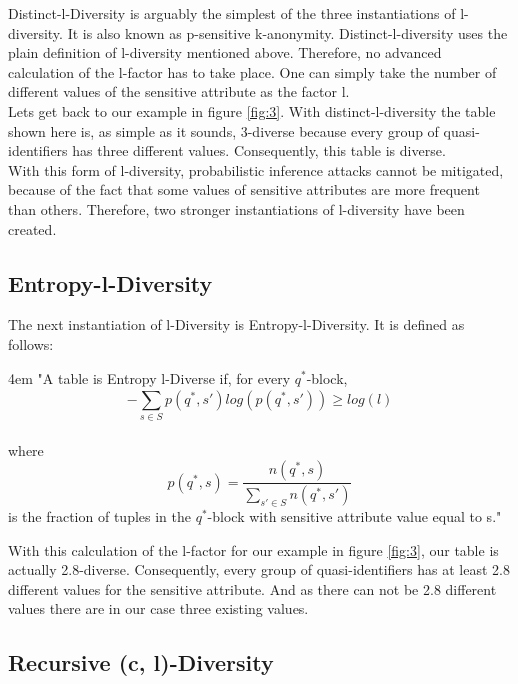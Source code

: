 \documentclass[12pt, a4paper,oneside]{report}
\begin{document}
Distinct-l-Diversity is arguably the simplest of the three instantiations of l-diversity. It is also known as p-sensitive k-anonymity. Distinct-l-diversity uses the plain definition of l-diversity mentioned above. Therefore, no advanced calculation of the l-factor has to take place. One can simply take the number of different values of the sensitive attribute as the factor l\cite{Fung2010}.\\
Lets get back to our example in figure \ref{fig:3}. With distinct-l-diversity the table shown here is, as simple as it sounds, 3-diverse because every group of quasi-identifiers has three different values. Consequently, this table is diverse.\\ 
With this form of l-diversity, probabilistic inference attacks cannot be mitigated, because of the fact that some values of sensitive attributes are more frequent than others. Therefore, two stronger instantiations of l-diversity have been created\cite{Fung2010}. 

\subsection{Entropy-l-Diversity}

The next instantiation of l-Diversity is Entropy-l-Diversity. It is defined as follows:
\par
\begingroup
\leftskip4em
\rightskip\leftskip
"A table is Entropy l-Diverse if, for every $q^*$-block,\\
\[ - \sum_{s \in S}^{}p(q^*, s')log(p(q^*, s')) \geq log(l)\]\\
where \[ p(q^*, s) = \frac{n(q^*, s)}{\sum_{s' \in S}^{}n(q^*, s')} \] is the fraction of tuples in the $q^*$-block with sensitive
attribute value equal to s."\cite{Machanavajjhala2006}\\
\par
\endgroup
 With this calculation of the l-factor for our example in figure \ref{fig:3}, our table is actually 2.8-diverse. Consequently, every group of quasi-identifiers has at least 2.8 different values for the sensitive attribute. And as there can not be 2.8 different values there are in our case three existing values.

\subsection{Recursive (c, l)-Diversity} \label{ssrec}
\end{document}
